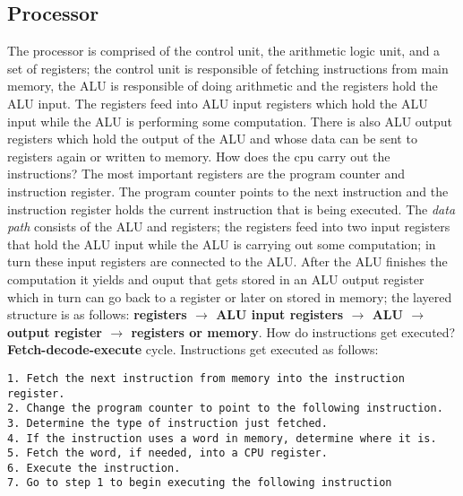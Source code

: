 \documentclass{amsbook}
\begin{document}
\subsection{Processor}
The processor is comprised of the control unit, the arithmetic logic unit, and a set of registers; the control unit is responsible of fetching instructions from main memory, the ALU is responsible of doing arithmetic and the registers hold the ALU input. The registers feed into ALU input registers which hold the ALU input while the ALU is performing some computation. There is also ALU output registers which hold the output of the ALU and whose data can be sent to registers again or written to memory. How does the cpu carry out the instructions? The most important registers are the program counter and instruction register. The program counter points to the next instruction and the instruction register holds the current instruction that is being executed. The \textit{data path} consists of the ALU and registers; the registers feed into two input registers that hold the ALU input while the ALU is carrying out some computation; in turn these input registers are connected to the ALU. After the ALU finishes the computation it yields and ouput that gets stored in an ALU output register which in turn can go back to a register or later on stored in memory; the layered structure is as follows: \textbf{registers $\rightarrow$ ALU input registers $\rightarrow$ ALU $\rightarrow$ output register $\rightarrow$ registers or memory}. How do instructions get executed? \textbf{Fetch-decode-execute} cycle. Instructions get executed as follows:
\begin{lstlisting}
1. Fetch the next instruction from memory into the instruction register.
2. Change the program counter to point to the following instruction.
3. Determine the type of instruction just fetched.
4. If the instruction uses a word in memory, determine where it is.
5. Fetch the word, if needed, into a CPU register.
6. Execute the instruction.
7. Go to step 1 to begin executing the following instruction
\end{lstlisting}
\end{document}
